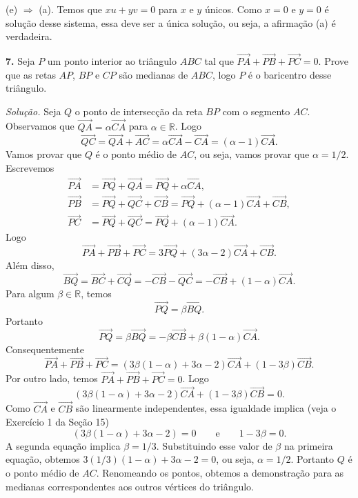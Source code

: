 \documentclass[a4paper,11pt]{article}
\newcommand{\R}{\mathbb{R}}
\begin{document}
(e) $\Rightarrow$ (a).
Temos que $xu + yv = 0$ para $x$ e $y$ únicos.
Como $x = 0$ e $y = 0$ é solução desse sistema, essa deve ser a única solução, ou seja, a afirmação (a) é verdadeira.

\vspace{\baselineskip}

\textbf{7.}
Seja $P$ um ponto interior ao triângulo $ABC$ tal que $\overrightarrow{PA} \!+\! \overrightarrow{PB} + \overrightarrow{PC} = 0$.
Prove que as retas $AP$, $BP$ e $CP$ são medianas de $ABC$, logo $P$ é o ba\-ri\-cen\-tro desse triângulo.

\vspace{\baselineskip}

\emph{Solução.}
Seja $Q$ o ponto de intersecção da reta $BP$ com o segmento $AC$.
Observamos que $\overrightarrow{QA} = \alpha \overrightarrow{CA}$ para $\alpha \in \R$.
Logo
\[
  \overrightarrow{QC} = \overrightarrow{QA} + \overrightarrow{AC} = \alpha \overrightarrow{CA} - \overrightarrow{CA} = (\alpha - 1) \overrightarrow{CA}.
\]
Vamos provar que $Q$ é o ponto médio de $AC$, ou seja, vamos provar que $\alpha = 1/2$.
Escrevemos
\begin{align*}
  \overrightarrow{PA} & = \overrightarrow{PQ} + \overrightarrow{QA} = \overrightarrow{PQ} + \alpha \overrightarrow{CA}, \\
  \overrightarrow{PB} & = \overrightarrow{PQ} + \overrightarrow{QC} + \overrightarrow{CB} = \overrightarrow{PQ} + (\alpha - 1) \overrightarrow{CA} + \overrightarrow{CB}, \\
  \overrightarrow{PC} & = \overrightarrow{PQ} + \overrightarrow{QC} = \overrightarrow{PQ} + (\alpha - 1) \overrightarrow{CA}.
\end{align*}
Logo
\[
  \overrightarrow{PA} + \overrightarrow{PB} + \overrightarrow{PC} = 3 \overrightarrow{PQ} + (3\alpha - 2) \overrightarrow{CA} + \overrightarrow{CB}.
\]
Além disso,
\[
  \overrightarrow{BQ} = \overrightarrow{BC} + \overrightarrow{CQ} = - \overrightarrow{CB} - \overrightarrow{QC} = - \overrightarrow{CB} + (1 - \alpha) \overrightarrow{CA}.
\]
Para algum $\beta \in \R$, temos
\[
  \overrightarrow{PQ} = \beta \overrightarrow{BQ}.
\]
Portanto
\[
  \overrightarrow{PQ} = \beta \overrightarrow{BQ} = - \beta \overrightarrow{CB} + \beta (1 - \alpha) \overrightarrow{CA}.
\]
Consequentemente
\[
  \overrightarrow{PA} + \overrightarrow{PB} + \overrightarrow{PC} = (3 \beta (1 - \alpha) + 3\alpha - 2) \overrightarrow{CA} + (1 - 3 \beta) \overrightarrow{CB}.
\]
Por outro lado, temos $\overrightarrow{PA} + \overrightarrow{PB} + \overrightarrow{PC} = 0$.
Logo
\[
  (3 \beta (1 - \alpha) + 3\alpha - 2) \overrightarrow{CA} + (1 - 3 \beta) \overrightarrow{CB} = 0.
\]
Como $\overrightarrow{CA}$ e $\overrightarrow{CB}$ são linearmente independentes, essa igualdade implica
(veja o Exercício 1 da Seção 15)
\[
  (3 \beta(1 - \alpha) + 3\alpha - 2) = 0 \qquad \text{e} \qquad 1 - 3 \beta = 0.
\]
A segunda equação implica $\beta = 1/3$.
Substituindo esse valor de $\beta$ na primeira equação, obtemos $3(1/3)(1 - \alpha) + 3\alpha - 2 = 0$, ou seja, $\alpha = 1/2$.
Portanto $Q$ é o ponto médio de $AC$.
Renomeando os pontos, obtemos a demonstração para as medianas correspondentes aos outros vértices do triângulo.
\end{document}
